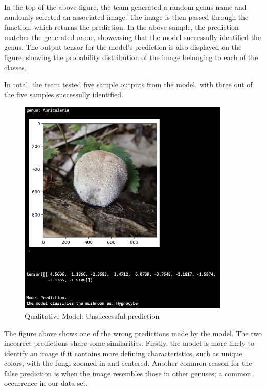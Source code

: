 \documentclass{article} %
\begin{document}
In the top of the above figure, the team generated a random genus name and randomly selected an associated image. The image is then passed through the function, which returns the prediction. In the above sample, the prediction matches the generated name, showcasing that the model successully identified the genus. The output tensor for the model's prediction is also displayed on the figure, showing the probability distribution of the image belonging to each of the classes.

In total, the team tested five sample outputs from the model, with three out of the five samples successully identified. 

\FloatBarrier
\begin{figure}[h]
    \begin{center}
    \includegraphics[width=0.9\textwidth]{figures/qualitativeResultImg2.png}
    \end{center}
    \caption{Qualitative Model: Unsuccessful prediction}
    \label{fig:badPrediction}
\end{figure}
\FloatBarrier

The figure above shows one of the wrong predictions made by the model. The two incorrect predictions share some similarities. Firstly, the model is more likely to identify an image if it contains more defining characteristics, such as unique colors, with the fungi zoomed-in and centered. Another common reason for the false prediction is when the image resembles those in other genuses; a common occurrence in our data set.
\end{document}
